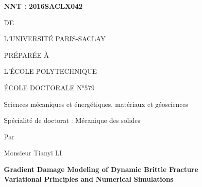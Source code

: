 
\begin{titlepage}

\begin{flushleft}
 \hfill
{}
\end{flushleft}
\vspace{10pt}

\begin{mdframed}
\begin{minipage}[t][22cm][t]{\textwidth}
\begin{flushleft}
\large\textbf{NNT : 2016SACLX042}
\end{flushleft}
\vspace{20pt}

\begin{center}
{\color{color02}{\LARGE THÈSE DE DOCTORAT}

\vspace{8pt}
{\LARGE DE}

\vspace{8pt}
{\LARGE L'UNIVERSITÉ PARIS-SACLAY}

\vspace{8pt}
{\LARGE PRÉPARÉE À}

\vspace{8pt}
{\LARGE L'ÉCOLE POLYTECHNIQUE}}

\vspace{36pt}
{\Large ÉCOLE DOCTORALE N°579}

\vspace{5pt}
{\Large Sciences mécaniques et énergétiques, matériaux et géosciences}

\vspace{16pt}
{\Large Spécialité de doctorat : Mécanique des solides}
\vspace{12pt}

{\large Par}
\vspace{12pt}

{\LARGE Monsieur Tianyi LI}
\vspace{36pt}

{\LARGE\bfseries
Gradient Damage Modeling of Dynamic Brittle Fracture \\ \vspace{0.4cm}
Variational Principles and Numerical Simulations}
\end{center}


\end{minipage}
\end{mdframed}
\end{titlepage}
